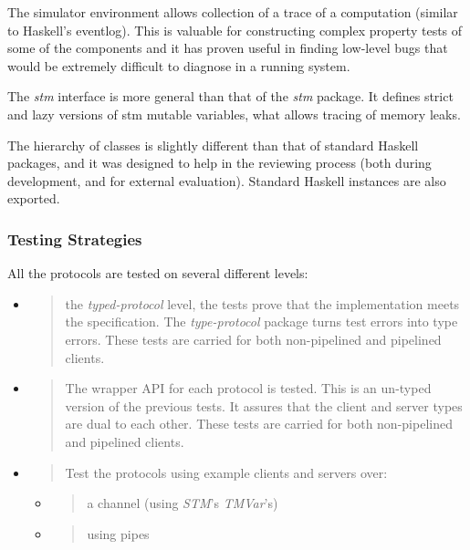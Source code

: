 \documentclass[11pt,a4paper]{article}
\begin{document}
The simulator environment allows collection of a trace of a computation
(similar to Haskell's eventlog). This is valuable for constructing
complex property tests of some of the components and it has proven
useful in finding low-level bugs that would be extremely difficult to
diagnose in a running system.

The \emph{stm} interface is more general than that of the \emph{stm}
package. It defines strict and lazy versions of stm mutable variables,
what allows tracing of memory leaks.

The hierarchy of classes is slightly different than that of standard
Haskell packages, and it was designed to help in the reviewing process
(both during development, and for external evaluation). Standard Haskell
instances are also exported.

\subsubsection{Testing Strategies}
\label{testing-strategies}

All the protocols are tested on several different levels:

\begin{itemize}
\item
  \begin{quote}
  the \emph{typed-protocol} level, the tests prove that the
  implementation meets the specification. The \emph{type-protocol}
  package turns test errors into type errors. These tests are carried
  for both non-pipelined and pipelined clients.
  \end{quote}
\item
  \begin{quote}
  The wrapper API for each protocol is tested. This is an un-typed
  version of the previous tests. It assures that the client and server
  types are dual to each other. These tests are carried for both
  non-pipelined and pipelined clients.
  \end{quote}
\item
  \begin{quote}
  Test the protocols using example clients and servers over:
  \end{quote}

  \begin{itemize}
  \item
    \begin{quote}
    a channel (using \emph{STM}'s \emph{TMVar}'s)
    \end{quote}
  \item
    \begin{quote}
    using pipes
    \end{quote}
  \end{itemize}
\end{itemize}
\end{document}
